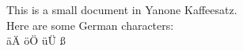 \documentclass{article}
\begin{document}
This is a small document in Yanone Kaffeesatz.
\\
Here are some German characters:
\\
äÄ öÖ üÜ ß
\end{document}
